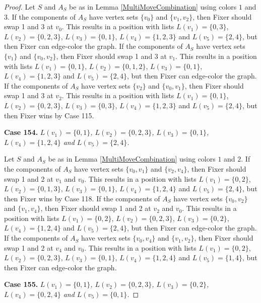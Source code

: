 \documentclass[12pt]{amsart}
\theoremstyle{plain}
\theoremstyle{definition}
\theoremstyle{remark}
\begin{document}
\begin{proof}
Let $S$ and $A_S$ be as in Lemma \ref{MultiMoveCombination} using colors $1$ and $3$. If the components of $A_S$ have vertex sets $\{v_0\}$ and $\{v_1, v_2\}$, then Fixer should swap 1 and 3 at $v_0$. This results in a position with lists $L(v_1) = \{0, 3\}$, $L(v_2) = \{0, 2, 3\}$, $L(v_3) = \{0, 1\}$, $L(v_4) = \{1, 2, 3\}$ and $L(v_5) = \{2, 4\}$, but then Fixer can edge-color the graph.
If the components of $A_S$ have vertex sets $\{v_1\}$ and $\{v_0, v_2\}$, then Fixer should swap 1 and 3 at $v_1$. This results in a position with lists $L(v_1) = \{0, 1\}$, $L(v_2) = \{0, 1, 2\}$, $L(v_3) = \{0, 1\}$, $L(v_4) = \{1, 2, 3\}$ and $L(v_5) = \{2, 4\}$, but then Fixer can edge-color the graph.
If the components of $A_S$ have vertex sets $\{v_2\}$ and $\{v_0, v_1\}$, then Fixer should swap 1 and 3 at $v_2$. This results in a position with lists $L(v_1) = \{0, 1\}$, $L(v_2) = \{0, 2, 3\}$, $L(v_3) = \{0, 3\}$, $L(v_4) = \{1, 2, 3\}$ and $L(v_5) = \{2, 4\}$, but then Fixer wins by Case 115.

\noindent\textbf{Case 154.  }\textit{$L(v_1) = \{0, 1\}$, $L(v_2) = \{0, 2, 3\}$, $L(v_3) = \{0, 1\}$, $L(v_4) = \{1, 2, 4\}$ and $L(v_5) = \{2, 4\}$.}

Let $S$ and $A_S$ be as in Lemma \ref{MultiMoveCombination} using colors $1$ and $2$. If the components of $A_S$ have vertex sets $\{v_0, v_1\}$ and $\{v_2, v_4\}$, then Fixer should swap 1 and 2 at $v_1$ and $v_0$. This results in a position with lists $L(v_1) = \{0, 2\}$, $L(v_2) = \{0, 1, 3\}$, $L(v_3) = \{0, 1\}$, $L(v_4) = \{1, 2, 4\}$ and $L(v_5) = \{2, 4\}$, but then Fixer wins by Case 118.
If the components of $A_S$ have vertex sets $\{v_0, v_2\}$ and $\{v_1, v_4\}$, then Fixer should swap 1 and 2 at $v_2$ and $v_0$. This results in a position with lists $L(v_1) = \{0, 2\}$, $L(v_2) = \{0, 2, 3\}$, $L(v_3) = \{0, 2\}$, $L(v_4) = \{1, 2, 4\}$ and $L(v_5) = \{2, 4\}$, but then Fixer can edge-color the graph.
If the components of $A_S$ have vertex sets $\{v_0, v_4\}$ and $\{v_1, v_2\}$, then Fixer should swap 1 and 2 at $v_4$ and $v_0$. This results in a position with lists $L(v_1) = \{0, 2\}$, $L(v_2) = \{0, 2, 3\}$, $L(v_3) = \{0, 1\}$, $L(v_4) = \{1, 2, 4\}$ and $L(v_5) = \{1, 4\}$, but then Fixer can edge-color the graph.

\noindent\textbf{Case 155.  }\textit{$L(v_1) = \{0, 1\}$, $L(v_2) = \{0, 2, 3\}$, $L(v_3) = \{0, 2\}$, $L(v_4) = \{0, 2, 4\}$ and $L(v_5) = \{0, 1\}$.}


\end{proof}
\end{document}
